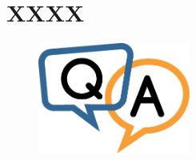 \documentclass[xcolor=svgnames]{beamer}
\subtitle{XXXX}
\date[2016-6-17]{}
\begin{document}

\section{XXXX}

\begin{frame}{}
  
\end{frame}

\begin{frame}[standout]
  \vspace{1.5cm}
  \begin{figure}
    \includegraphics[width=5cm]{qa.png}
  \end{figure}
  \thispagestyle{empty}
\end{frame}
\end{document}
